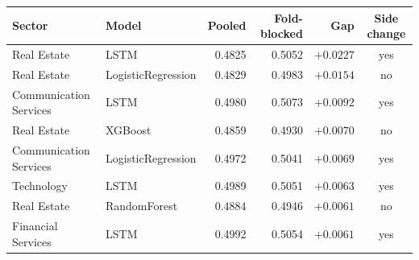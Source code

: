 \begin{tabular}{llrrrc}
\toprule
Sector & Model & Pooled & Fold-blocked & Gap & Side change \\
\midrule
Real Estate & LSTM & 0.4825 & 0.5052 & $+0.0227$ & yes \\
Real Estate & LogisticRegression & 0.4829 & 0.4983 & $+0.0154$ & no \\
Communication Services & LSTM & 0.4980 & 0.5073 & $+0.0092$ & yes \\
Real Estate & XGBoost & 0.4859 & 0.4930 & $+0.0070$ & no \\
Communication Services & LogisticRegression & 0.4972 & 0.5041 & $+0.0069$ & yes \\
Technology & LSTM & 0.4989 & 0.5051 & $+0.0063$ & yes \\
Real Estate & RandomForest & 0.4884 & 0.4946 & $+0.0061$ & no \\
Financial Services & LSTM & 0.4992 & 0.5054 & $+0.0061$ & yes \\
\bottomrule
\end{tabular}
